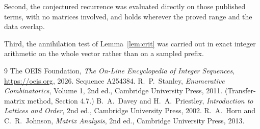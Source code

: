 \documentclass[11pt,a4paper]{article}
\theoremstyle{plain}
\theoremstyle{definition}
\begin{document}
Second, the conjectured recurrence was evaluated directly on those published terms, with no
matrices involved, and holds wherever the proved range and the data overlap.

Third, the annihilation test of Lemma~\ref{lem:crit} was carried out in exact integer
arithmetic on the whole vector rather than on a sampled prefix.

\begin{thebibliography}{9}
 The OEIS Foundation, \emph{The On-Line Encyclopedia of Integer
Sequences}, \url{https://oeis.org}, 2026. Sequence A254384.
 R.~P.~Stanley, \emph{Enumerative Combinatorics}, Volume 1, 2nd ed.,
Cambridge University Press, 2011. (Transfer-matrix method, Section 4.7.)
 B.~A.~Davey and H.~A.~Priestley, \emph{Introduction to Lattices and
Order}, 2nd ed., Cambridge University Press, 2002.
 R.~A.~Horn and C.~R.~Johnson, \emph{Matrix Analysis}, 2nd ed., Cambridge
University Press, 2013.
\end{thebibliography}
\end{document}
